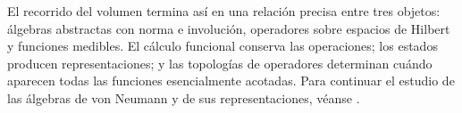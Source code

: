 El recorrido del volumen termina así en una relación precisa entre tres objetos: álgebras abstractas con norma e involución, operadores sobre espacios de Hilbert y funciones medibles. El cálculo funcional conserva las operaciones; los estados producen representaciones; y las topologías de operadores determinan cuándo aparecen todas las funciones esencialmente acotadas. Para continuar el estudio de las álgebras de von Neumann y de sus representaciones, véanse \cite{conway1990,murphy1990,zhu1993,rudin1991}.

